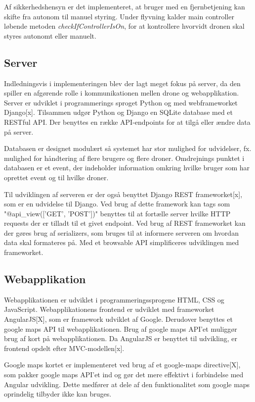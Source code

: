 Af sikkerhedshensyn er det implementeret, at bruger med en fjernbetjening kan skifte fra autonom til manuel styring. Under flyvning kalder main controller løbende metoden \textit{checkIfControllerIsOn}, for at kontrollere hvorvidt dronen skal styres autonomt eller manuelt.  

\subsection{Server}
Indledningsvis i implementeringen blev der lagt meget fokus på server, da den spiller en afgørende rolle i kommunikationen mellen drone og webapplikation. 
Server er udviklet i programmerings sproget Python og med webframeworket Django[x].
Tilsammen udgør Python og Django en SQLite database med et RESTful API. Der benyttes en række API-endpoints for at tilgå eller ændre data på server.

Databasen er designet modulært så systemet har stor mulighed for udvidelser, fx. mulighed for håndtering af flere brugere og flere droner. Omdrejnings punktet i databasen er et event, der indeholder information omkring hvilke bruger som har oprettet event og til hvilke droner.

Til udviklingen af serveren er der også benyttet Django REST frameworket[x], som er en udvidelse til Django. Ved brug af dette framework kan tags som "@api\_view(['GET', 'POST'])" benyttes til at fortælle server hvilke HTTP requests der er tilladt til et givet endpoint. 
Ved brug af REST frameworket kan der gøres brug af serializers, som bruges til at informere  serveren om hvordan data skal formateres på. Med et browsable API simplificeres udviklingen med frameworket.

\newpage
\subsection{Webapplikation}
Webapplikationen  er udviklet i programmeringssprogene HTML, CSS og JavaScript. Webapplikationens frontend er udviklet med frameworket AngularJS[X], som er framework udviklet af Google. Derudover benyttes et google maps API til webapplikationen. Brug af google maps API'et muliggør brug af kort på webapplikationen. Da AngularJS er benyttet til udvikling, er frontend opdelt efter MVC-modellen[x]. 

Google maps kortet er implementeret ved brug af et google-maps directive[X], som pakker google maps API'et ind og gør det mere effektivt i forbindelse med Angular udvikling. Dette medfører at dele af den funktionalitet som google maps oprindelig tilbyder ikke kan bruges. 

